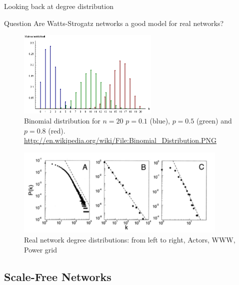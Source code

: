 \begin{frame}{Looking back at degree distribution}

\begin{block}{Question}
Are Watts-Strogatz networks a good model for real networks?
\end{block}

\begin{overprint}

\begin{figure}
	\includegraphics[width=0.6\textwidth]{figs/08/binomial}
	\caption{Binomial distribution for $n = 20$
$p = 0.1$ (blue), $p = 0.5$ (green) and $p = 0.8$ (red).
{\scriptsize \url{http://en.wikipedia.org/wiki/File:Binomial_Distribution.PNG}}
}
\end{figure}


\begin{figure}
	\includegraphics[width=0.9\textwidth]{figs/08/threeex}
	\caption{Real network degree distributions: from left to right, Actors, WWW, Power grid}
\end{figure}
	
\end{overprint}
	
\end{frame}

\subsection{Scale-Free Networks}

